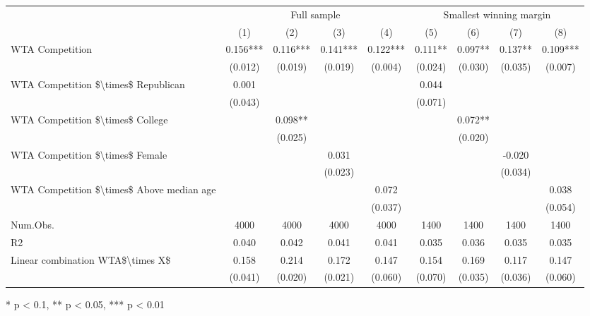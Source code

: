 \begin{table}[t]
\fontsize{12.0pt}{14.4pt}\selectfont
\begin{tabular*}{\linewidth}{@{\extracolsep{\fill}}lcccccccc}
\toprule
 & \multicolumn{4}{c}{Full sample} & \multicolumn{4}{c}{Smallest winning margin} \\ 
\cmidrule(lr){2-5} \cmidrule(lr){6-9}
  & (1) & (2) & (3) & (4) & (5) & (6) & (7) & (8) \\ 
\midrule\addlinespace[2.5pt]
WTA Competition & 0.156*** & 0.116*** & 0.141*** & 0.122*** & 0.111** & 0.097** & 0.137** & 0.109*** \\ 
 & (0.012) & (0.019) & (0.019) & (0.004) & (0.024) & (0.030) & (0.035) & (0.007) \\ 
WTA Competition \$\textbackslash{}times\$ Republican & 0.001 &  &  &  & 0.044 &  &  &  \\ 
 & (0.043) &  &  &  & (0.071) &  &  &  \\ 
WTA Competition \$\textbackslash{}times\$ College &  & 0.098** &  &  &  & 0.072** &  &  \\ 
 &  & (0.025) &  &  &  & (0.020) &  &  \\ 
WTA Competition \$\textbackslash{}times\$ Female &  &  & 0.031 &  &  &  & -0.020 &  \\ 
 &  &  & (0.023) &  &  &  & (0.034) &  \\ 
WTA Competition \$\textbackslash{}times\$ Above median age &  &  &  & 0.072 &  &  &  & 0.038 \\ 
{} & {} & {} & {} & {(0.037)} & {} & {} & {} & {(0.054)} \\ 
Num.Obs. & 4000 & 4000 & 4000 & 4000 & 1400 & 1400 & 1400 & 1400 \\ 
R2 & 0.040 & 0.042 & 0.041 & 0.041 & 0.035 & 0.036 & 0.035 & 0.035 \\ 
Linear combination WTA\$\textbackslash{}times X\$ & 0.158 & 0.214 & 0.172 & 0.147 & 0.154 & 0.169 & 0.117 & 0.147 \\ 
 & (0.041) & (0.020) & (0.021) & (0.060) & (0.070) & (0.035) & (0.036) & (0.060) \\ 
\bottomrule
\end{tabular*}
\begin{minipage}{\linewidth}
* p < 0.1, ** p < 0.05, *** p < 0.01\\
\end{minipage}
\end{table}

